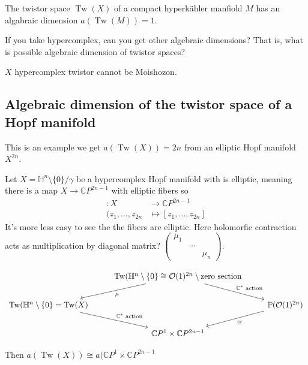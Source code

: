 \begin{thm}[Verbitsky]\leavevmode
	The twistor space $\operatorname{Tw}(X)$ of a compact hyperkähler manfiold $M$ has an algabraic dimension $a(\operatorname{Tw}(M))=1$.
\end{thm}

\begin{question}\leavevmode
	If you take hypercomplex, can you get other algebraic dimensions? That is, what is possible algebraic dimension of twistor spaces?
\end{question}

\begin{thm}\leavevmode
	$X$ hypercomplex twistor cannot be Moishozon.
\end{thm}

\subsection{Algebraic dimension of the twistor space of a Hopf manifold}
{\color{5}This is an example we get $a(\operatorname{Tw}(X))=2n$ from an elliptic Hopf manifold $X^{2n}.$}

Let $X=\mathbb{H}^n\setminus \{0\} /\gamma$ be a hypercomplex Hopf manifold with is elliptic, meaning there is a map $X\to \mathbb{C}P^{2n-1}$ with elliptic fibers so
\begin{align*}
	:X  &\longrightarrow \mathbb{C}P^{2n-1} \\
	(z_1,\ldots,z_{2n} &\longmapsto [z_1,\ldots,z_{2n}]
\end{align*}
It's more less easy to see the the fibers are elliptic. Here holomorfic contraction acts as multiplication by diagonal matrix?  $\begin{pmatrix} \mu_1&& \\& \cdots & \\&&\mu_{n}\end{pmatrix} $.

\[\begin{tikzcd}
	&\operatorname{Tw}(\mathbb{H}^n\setminus \{0\} \cong \mathcal{O}(1)^{2n}\setminus \text{zero section} \arrow[dl,"\mu"]\arrow[dr,"\mathbb{C}^*\text{ action}" ]\\
	\operatorname{Tw}(\mathbb{H}^n\setminus \{0\}= \operatorname{Tw}(X)\arrow[dr,"\mathbb{C}^*\text{ action} "]&  &  \mathbb{P}(\mathcal{O}(1)^{2n})\arrow[dl,"\cong "]\\
	&\mathbb{C}P^{1}\times \mathbb{C}P^{2n-1}
\end{tikzcd}\]

Then $a(\operatorname{Tw}(X))\cong a(\mathbb{C}P^{1}\times \mathbb{C}P^{2n-1}$

